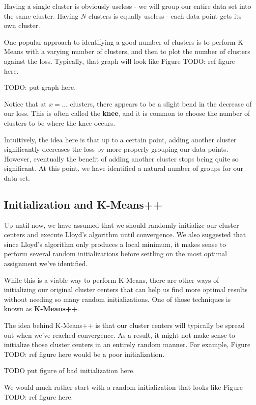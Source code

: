 Having a single cluster is obviously useless - we will group our entire data set into the same cluster. Having $N$ clusters is equally useless - each data point gets its own cluster.

One popular approach to identifying a good number of clusters is to perform K-Means with a varying number of clusters, and then to plot the number of clusters against the loss. Typically, that graph will look like Figure TODO: ref figure here.

TODO: put graph here.

Notice that at $x=...$ clusters, there appears to be a slight bend in the decrease of our loss. This is often called the \textbf{knee}, and it is common to choose the number of clusters to be where the knee occurs.

Intuitively, the idea here is that up to a certain point, adding another cluster significantly decreases the loss by more properly grouping our data points. However, eventually the benefit of adding another cluster stops being quite so significant. At this point, we have identified a natural number of groups for our data set.

\subsection{Initialization and K-Means++}
Up until now, we have assumed that we should randomly initialize our cluster centers and execute Lloyd's algorithm until convergence. We also suggested that since Lloyd's algorithm only produces a local minimum, it makes sense to perform several random initializations before settling on the most optimal assignment we've identified.

While this is a viable way to perform K-Means, there are other ways of initializing our original cluster centers that can help us find more optimal results without needing so many random initializations. One of those techniques is known as \textbf{K-Means++}.

The idea behind K-Means++ is that our cluster centers will typically be spread out when we've reached convergence. As a result, it might not make sense to initialize those cluster centers in an entirely random manner. For example, Figure TODO: ref figure here would be a poor initialization.

TODO put figure of bad initialization here.

We would much rather start with a random initialization that looks like Figure TODO: ref figure here.

